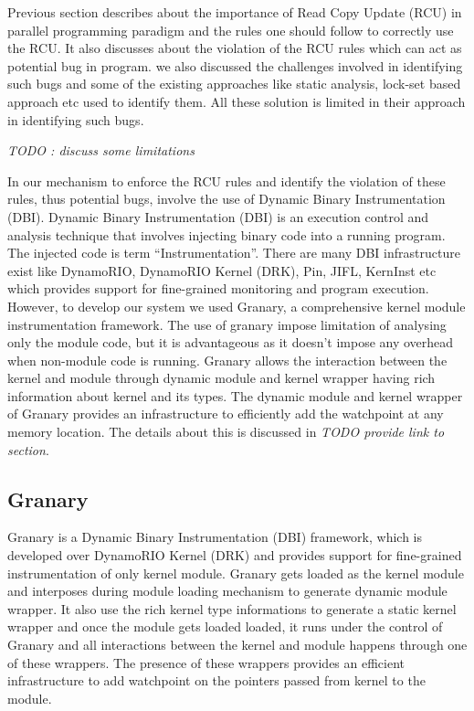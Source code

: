 Previous section describes about the importance of Read Copy Update (RCU) in parallel programming paradigm and the rules one should follow to correctly use the RCU. It also discusses about the violation of the RCU rules which can act as potential bug in program. we also discussed the challenges involved in identifying such bugs and some of the existing approaches like static analysis, lock-set based approach etc used to identify them. All these solution is limited in their approach in identifying such bugs.

\emph{TODO : discuss some limitations}  

In our mechanism to enforce the RCU rules and identify the violation of these rules, thus potential bugs, involve the use of Dynamic Binary Instrumentation (DBI). Dynamic Binary Instrumentation (DBI) is an execution control and analysis technique that involves injecting binary code into a running program. The injected code is term “Instrumentation”. There are many DBI infrastructure exist like DynamoRIO, DynamoRIO Kernel (DRK),  Pin, JIFL, KernInst etc which provides support for fine-grained monitoring and program execution. However, to develop our system we used Granary, a comprehensive kernel module instrumentation framework. The use of granary impose limitation of analysing only the module code, but it is advantageous as it doesn’t impose any overhead when non-module code is running. Granary allows the interaction between the kernel and module through dynamic module and kernel wrapper having rich information about kernel and its types. The dynamic module and kernel wrapper of Granary provides an infrastructure to efficiently add the watchpoint at any memory location. The details about this is discussed in \emph{TODO provide link to section}.


\subsection{Granary}
Granary is a Dynamic Binary Instrumentation (DBI) framework, which is developed over DynamoRIO Kernel (DRK) and provides support for fine-grained instrumentation of only kernel module. Granary gets loaded as the kernel module and interposes during module loading mechanism to generate dynamic module wrapper. It also use the rich kernel type informations to generate a static kernel wrapper and once the module gets loaded loaded, it runs under the control of Granary and all interactions between the kernel and module happens through one of these wrappers. The presence of these wrappers provides an efficient infrastructure to add watchpoint on the pointers passed from kernel to the module.   


